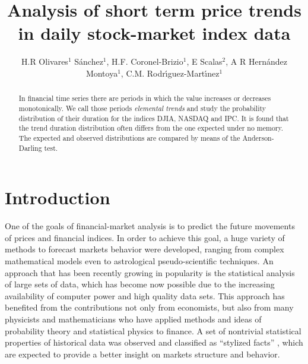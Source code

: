 \documentclass[a4paper]{jpconf}
\begin{document}
\title{Analysis of short term price trends in daily stock-market index data}

\author{H.R Olivares$^1$ S\'anchez$^1$, H.F. Coronel-Brizio$^1$, E Scalas$^2$,  A R Hern\'andez Montoya$^1$, C.M. Rodr\'{\i}guez-Mart\'{\i}nez$^1$}

\address{$^1$Facultad de F\'{\i}sica. Universidad Veracruzana, Apdo. Postal 475. Xalapa, Veracruz. M\'{e}xico.}

\address{$^2$Dipartimento di Scienze e Innovazione Tecnologica,
Universit\`a del Piemonte Orientale ``Amedeo Avogadro'', Viale T. Michel 11, 15121 Alessandria, Italy. BCAM-Basque Center for Applied Mathematics, Alameda de Mazarredo 14, 48009 Bilbao, Basque Contry, Spain.}



\begin{abstract}
In financial time series there are periods in which the value increases or decreases monotonically. We call those periods {\it elemental trends} and study the probability distribution of their duration for the indices DJIA, NASDAQ and IPC. It is found that the trend duration distribution often differs from the one expected under no memory. The expected and observed distributions are compared by means of the Anderson-Darling test.
\end{abstract}

\section{Introduction}
\label{intro}
One of the goals of financial-market analysis is to predict the future movements of prices and financial indices. In order to achieve this goal, a huge variety of methods to forecast markets behavior were developed, ranging from complex mathematical models even to astrological pseudo-scientific techniques. An approach that has been recently growing in popularity is the statistical analysis of large sets of data, which has become now possible due to the increasing availability of computer power and high quality data sets. This approach has benefited from the contributions not only from economists, but also from many physicists and mathematicians who have applied methods and ideas of probability theory and statistical physics to finance. A set of nontrivial statistical properties of historical data was observed and classified as ``stylized facts'' \cite{Rama}, which are expected to provide a better insight on markets structure and behavior.
\end{document}
